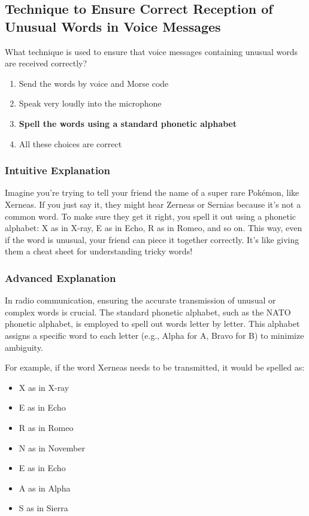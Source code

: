 \subsection{Technique to Ensure Correct Reception of Unusual Words in Voice Messages}
\label{T2C03}

\begin{tcolorbox}[colback=gray!10!white,colframe=black!75!black,title=T2C03]
What technique is used to ensure that voice messages containing unusual words are received correctly?
\begin{enumerate}[label=\Alph*)]
    \item Send the words by voice and Morse code
    \item Speak very loudly into the microphone
    \item \textbf{Spell the words using a standard phonetic alphabet}
    \item All these choices are correct
\end{enumerate}
\end{tcolorbox}

\subsubsection{Intuitive Explanation}
Imagine you're trying to tell your friend the name of a super rare Pokémon, like Xerneas. If you just say it, they might hear Zerneas or Sernias because it’s not a common word. To make sure they get it right, you spell it out using a phonetic alphabet: X as in X-ray, E as in Echo, R as in Romeo, and so on. This way, even if the word is unusual, your friend can piece it together correctly. It’s like giving them a cheat sheet for understanding tricky words!

\subsubsection{Advanced Explanation}
In radio communication, ensuring the accurate transmission of unusual or complex words is crucial. The standard phonetic alphabet, such as the NATO phonetic alphabet, is employed to spell out words letter by letter. This alphabet assigns a specific word to each letter (e.g., Alpha for A, Bravo for B) to minimize ambiguity. 

For example, if the word Xerneas needs to be transmitted, it would be spelled as:
\begin{itemize}
    \item X as in X-ray
    \item E as in Echo
    \item R as in Romeo
    \item N as in November
    \item E as in Echo
    \item A as in Alpha
    \item S as in Sierra
\end{itemize}

